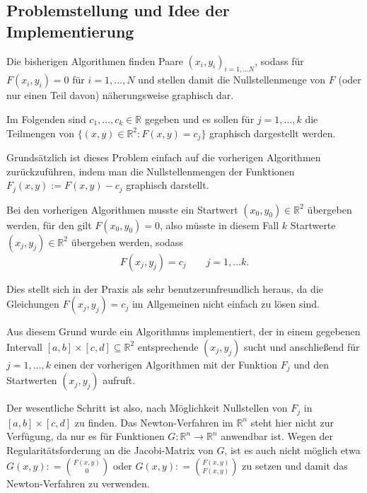 \documentclass[a4paper,11pt,bibliography=totoc,listof=totoc,headinclude=true,cleardoublepage=empty,oneside]{scrartcl}
\newcommand{\R}{\mathbb{R}}
\renewcommand{\subset}{\subseteq}
\begin{document}
\subsection{Problemstellung und Idee der Implementierung}

Die bisherigen Algorithmen finden Paare $(x_i,y_i)_{i=1,\dots N}$, sodass für $F(x_i,y_i)=0$ für $i=1,\dots, N$ und stellen damit die Nullstellenmenge von $F$ (oder nur einen Teil davon) näherungsweise graphisch dar. 

Im Folgenden sind $c_1,\dots, c_k \in \R$ gegeben und es sollen für $j=1,\dots,k$ die Teilmengen von $\{ (x,y) \in \R^2 : F(x,y)=c_j \}$ graphisch dargestellt werden.

Grundsätzlich ist dieses Problem einfach auf die vorherigen Algorithmen zurückzuführen, indem man die Nullstellenmengen der Funktionen $F_j(x,y) := F(x,y) -c_j$ graphisch darstellt.

Bei den vorherigen Algorithmen musste ein Startwert $(x_0,y_0) \in \R^2$ übergeben werden, für den gilt $F(x_0,y_0)=0$, also müsste in diesem Fall $k$ Startwerte $(x_j,y_j) \in \R^2$ übergeben werden, sodass
\[
F(x_j,y_j) = c_j \qquad j=1,\dots k.
\]

Dies stellt sich in der Praxis als sehr benutzerunfreundlich heraus, da die Gleichungen $F(x_j,y_j)=c_j$ im Allgemeinen nicht einfach zu lösen sind. 

Aus diesem Grund wurde ein Algorithmus implementiert, der in einem gegebenen Intervall $[a,b]\times[c,d] \subset \R^2$ entsprechende $(x_j,y_j)$ sucht und anschließend für $j=1,\dots, k$ einen der vorherigen Algorithmen mit der Funktion $F_j$ und den Startwerten $(x_j,y_j)$ aufruft. 

Der wesentliche Schritt ist also, nach Möglichkeit Nullstellen von $F_j$ in $[a,b] \times [c,d]$ zu finden. Das Newton-Verfahren im $\R^n$ steht hier nicht zur Verfügung, da nur es für Funktionen $G: \R^n \to \R^n$ anwendbar ist. Wegen der Regularitätsforderung  an die Jacobi-Matrix von $G$, ist es auch nicht möglich etwa $G(x,y) : = \binom{F(x,y)}{0}$ oder $G(x,y) : = \binom{F(x,y)}{F(x,y)}$ zu setzen und damit das Newton-Verfahren zu verwenden.
\end{document}
